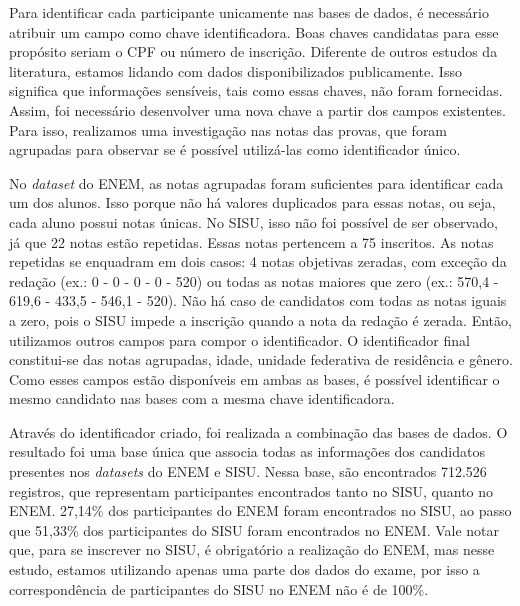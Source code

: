 Para identificar cada participante unicamente nas bases de dados, é necessário atribuir um campo como chave identificadora. Boas chaves candidatas para esse propósito seriam o CPF ou número de inscrição. Diferente de outros estudos da literatura, estamos lidando com dados disponibilizados publicamente. Isso significa que informações sensíveis, tais como essas chaves, não foram fornecidas. Assim, foi necessário desenvolver uma nova chave a partir dos campos existentes. 
Para isso, realizamos uma investigação nas notas das provas, que foram agrupadas 
para observar se é possível utilizá-las como identificador único. 

No \textit{dataset} do ENEM, as notas agrupadas foram suficientes para identificar cada um dos alunos. Isso porque não há valores duplicados para essas notas, ou seja, cada aluno possui notas únicas. No SISU, isso não foi possível de ser observado, já que 22 notas estão repetidas. Essas notas pertencem a 75 inscritos. As notas repetidas se enquadram em dois casos: 4 notas objetivas zeradas, com exceção da redação (ex.: 0 - 0 - 0 - 0 - 520) ou todas as notas maiores que zero (ex.: 570,4 - 619,6 - 433,5 - 546,1 - 520). Não há caso de candidatos com todas as notas iguais a zero, pois o SISU impede a inscrição quando a nota da redação é zerada. Então, utilizamos outros campos para compor o identificador. O identificador final constitui-se das notas agrupadas, idade, unidade federativa de residência e gênero. Como esses campos estão disponíveis em ambas as bases, é possível identificar o mesmo candidato nas bases com a mesma chave identificadora.

Através do identificador criado, foi realizada a combinação das bases de dados. O resultado foi uma base única que associa todas as informações dos candidatos presentes nos \textit{datasets} do ENEM e SISU. Nessa base, são encontrados 712.526 registros, que representam participantes encontrados tanto no SISU, quanto no ENEM. 27,14\% dos participantes do ENEM foram encontrados no SISU, ao passo que 51,33\% dos participantes do SISU foram encontrados no ENEM. Vale notar que, para se inscrever no SISU, é obrigatório a realização do ENEM, mas nesse estudo, estamos utilizando apenas uma parte dos dados do exame, por isso a correspondência de participantes do SISU no ENEM não é de 100\%.

